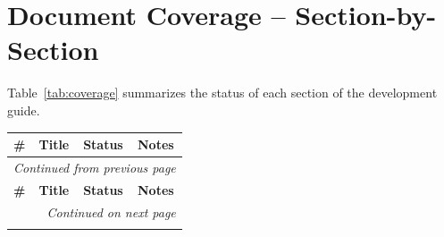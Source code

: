 \documentclass[11pt,a4paper]{report}
\begin{document}
\chapter{Document Coverage -- Section-by-Section}

Table~\ref{tab:coverage} summarizes the status of each section of the development guide.

\begin{longtable}{@{}p{1.2em} p{4.2cm} p{1.8cm} p{5.8cm}@{}}
  \toprule
  \textbf{\#} & \textbf{Title} & \textbf{Status} & \textbf{Notes} \\
  \midrule
  \endfirsthead

  \multicolumn{4}{l}{\textit{Continued from previous page}} \\
  \toprule
  \textbf{\#} & \textbf{Title} & \textbf{Status} & \textbf{Notes} \\
  \midrule
  \endhead

  \bottomrule
  \multicolumn{4}{r}{\textit{Continued on next page}} \\
  \endfoot

  \bottomrule
  \endlastfoot


\end{longtable}
\end{document}
